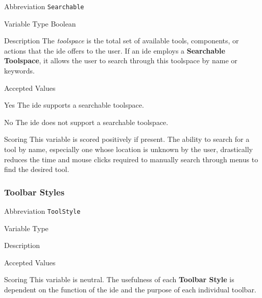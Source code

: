 \begin{AlignedDesc}
  \item[Abbreviation] \texttt{Searchable}

  \item[Variable Type] Boolean

  \item[Description] The \textit{toolspace} is the total set of available
  tools, components, or actions that the \ac{ide} offers to the user. If an
  \ac{ide} employs a \textbf{Searchable Toolspace}, it allows the user to
  search through this toolspace by name or keywords.

  \item[Accepted Values]

  \begin{AlignedDesc}
    \item[Yes] The \ac{ide} supports a searchable toolspace.
    \item[No] The \ac{ide} does not support a searchable toolspace.
  \end{AlignedDesc}

  \item[Scoring] This variable is scored positively if present. The ability
  to search for a tool by name, especially one whose location is unknown by
  the user, drastically reduces the time and mouse clicks required to
  manually search through menus to find the desired tool.

\end{AlignedDesc}

\subsubsection{Toolbar Styles}
\label{subsubsec:toolstyle}

\begin{AlignedDesc}
  \item[Abbreviation] \texttt{ToolStyle}

  \item[Variable Type]

  \item[Description]

  \item[Accepted Values]

  \begin{AlignedDesc}
    \item[\textellipsis]
  \end{AlignedDesc}

  \item[Scoring] This variable is neutral. The usefulness of each
  \textbf{Toolbar Style} is dependent on the function of the \ac{ide} and
  the purpose of each individual toolbar.

\end{AlignedDesc}

